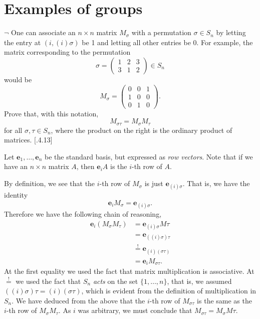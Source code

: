 \section{Examples of groups}
\extitle

\begin{exercise}
	$\neg$ One can associate an $n\times n$ matrix $M_{\sigma}$ with a permutation $\sigma\in S_n$ by letting the entry at $(i,(i)\sigma)$ be 1 and letting all other entries be 0. For example, the matrix corresponding to the permutation
	\[
		\sigma = 
		\begin{pmatrix}
			1 & 2 & 3 \\
			3 & 1 & 2
		\end{pmatrix}
		\in S_n
	\]
	 would be 
	 \[
	 	M_\sigma = 
	 	\begin{pmatrix}
	 		0 & 0 & 1\\
	 		1 & 0 & 0\\
	 		0 & 1 & 0 
	 	\end{pmatrix}.
	 \]
	 Prove that, with this notation, 
	 \[M_{\sigma\tau} = M_\sigma M_\tau\]
	 for all $\sigma, \tau\in S_n$, where the product on the right is the ordinary product of matrices. [.4.13]
\end{exercise}
\begin{solution}
	Let $\mathbf{e}_1,\ldots, \mathbf{e}_n$ be the standard basis, but expressed as \emph{row vectors}. Note that if we have an $n\times n$ matrix $A$, then $\mathbf{e}_iA$ is the $i$-th row of $A$.
	
	By definition, we see that the $i$-th row of $M_\sigma$ is just $\mathbf{e}_{(i)\sigma}$. That is, we have the identity
	\[
		\mathbf{e}_iM_\sigma = \mathbf{e}_{(i)\sigma}.
	\]
	Therefore we have the following chain of reasoning,
	\begin{align*}
		\mathbf{e}_i(M_\sigma M_\tau) &= \mathbf{e}_{(i)\sigma}M\tau\\
		&= \mathbf{e}_{((i)\sigma)\tau} \\
		&\overset{!}{=} \mathbf{e}_{(i)(\sigma\tau)}\\
		&= \mathbf{e}_iM_{\sigma\tau}. 
	\end{align*}
	At the first equality we used the fact that matrix multiplication is associative. At $\overset{!}{=}$ we used the fact that $S_n$ \emph{acts} on the set $\{1,\ldots, n\}$, that is, we assumed $((i)\sigma)\tau = (i)(\sigma\tau)$, which is evident from the definition of multiplication in $S_n$. We have deduced from the above that the $i$-th row of $M_{\sigma\tau}$ is the same as the $i$-th row of $M_{\sigma}M_\tau$. As $i$ was arbitrary, we must conclude that $M_{\sigma\tau} = M_{\sigma}M\tau$.
\end{solution}


